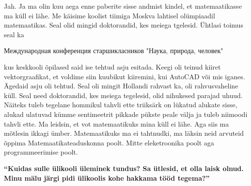 Jah. Ja ma olin kuu aega enne paberite sisse andmist kindel, et matemaatikasse ma küll ei lähe. Me käisime koolist tiimiga Moskva lahtisel olümpiaadil matemaatikas. Seal olid mingid doktorandid, kes  meiega tgelesid. Ühtlasi toimus seal ka \begin{russian}Международная конференция старшикласников "Наука, природа, человек"\end{russian} kus keskkooli õpilased said ise tehtud asju esitada. Keegi oli teinud kiiret vektorgraafikat, et voldime siin kuubikut kiiremini, kui AutoCAD või mis iganes. Ägedaid asju oli tehtud. Seal oli mingit Hollandi rahvast ka, oli rahvusvaheline küll. Seal need doktorandid, kes meiega tegelesid, olid nihukesed parajad uhuud. Näiteks tuleb tegelane hommikul tahvli ette triiksärk on lükatud alukate sisse, alukad ulatuvad kümme sentimeetrit pikkade pükste peale välja ja tuleb niimoodi tahvli ette. Ma leidsin, et vot matemaatikuks mina küll ei lähe. Aga siis ma mõtlesin ikkagi ümber. Matemaatikuks ma ei tahtnudki, ma läksin neid arvuteid õppima Matemaatikateaduskonna poolt. Mitte eleketroonika poolt aga programmeerimise poolt. 

\textbf{\enquote{Kuidas sulle ülikooli üleminek tundus? Sa ütlesid, et olla laisk olnud. Minu mälu järgi pidi ülikoolis kohe hakkama tööd tegema?}}


